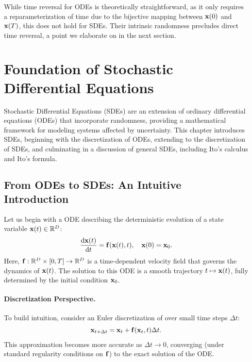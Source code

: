 While time reversal for ODEs is theoretically straightforward, as it only requires a reparameterization of time due to the bijective mapping between ${\mathbf{x}}(0)$ and ${\mathbf{x}}(T)$, this does not hold for SDEs. Their intrinsic randomness precludes direct time reversal, a point we elaborate on in the next section.

\newpage
\clearpage


\section{Foundation of Stochastic Differential Equations}\label{app:sde-intro}

Stochastic Differential Equations (SDEs) are an extension of ordinary differential equations (ODEs) that incorporate randomness, providing a mathematical framework for modeling systems affected by uncertainty. This chapter introduces SDEs, beginning with the discretization of ODEs, extending to the discretization of SDEs, and culminating in a discussion of general SDEs, including Ito's calculus and Ito's formula.

\subsection{From ODEs to SDEs: An Intuitive Introduction}
Let us begin with a ODE describing the deterministic evolution of a state variable $ {\mathbf{x}}(t) \in \mathbb{R}^D $:
\begin{equation}
    \frac{\mathop{}\!\mathrm{d}{\mathbf{x}}(t)}{\mathop{}\!\mathrm{d} t} = {\mathbf{f}}({\mathbf{x}}(t), t), \quad {\mathbf{x}}(0) = {\mathbf{x}}_0.
    \label{eq:ode}
\end{equation}
Here, $ {\mathbf{f}}: \mathbb{R}^D \times [0,T] \rightarrow \mathbb{R}^D $ is a time-dependent velocity field that governs the dynamics of $ {\mathbf{x}}(t) $. The solution to this ODE is a smooth trajectory $ t \mapsto {\mathbf{x}}(t) $, fully determined by the initial condition $ {\mathbf{x}}_0 $.

\paragraph{Discretization Perspective.} To build intuition, consider an Euler discretization of  over small time steps $ \Delta t $:
\begin{equation*}
    {\mathbf{x}}_{t+\Delta t} = {\mathbf{x}}_t + {\mathbf{f}}({\mathbf{x}}_t, t) \Delta t.
\end{equation*}
This approximation becomes more accurate as $ \Delta t \to 0 $, converging (under standard regularity conditions on $ {\mathbf{f}} $) to the exact solution of the ODE.


